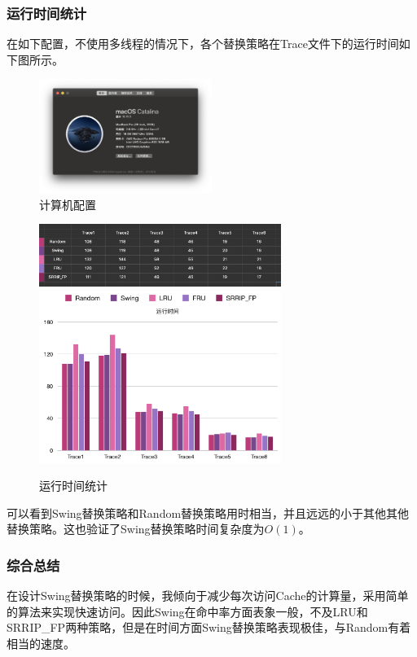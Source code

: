 \documentclass{article}
\begin{document}
\subsubsection{运行时间统计}
在如下配置，不使用多线程的情况下，各个替换策略在Trace文件下的运行时间如下图所示。
\begin{figure}[H]
    \centering
    \includegraphics[width=0.5\textwidth]{pic8.png}
    \caption{计算机配置}
\end{figure}

\begin{figure}[H]
    \centering
    \includegraphics[width=0.7\textwidth]{pic10.png}
    \includegraphics[width=0.7\textwidth]{pic9.png}
    \caption{运行时间统计}
\end{figure}
可以看到Swing替换策略和Random替换策略用时相当，并且远远的小于其他其他替换策略。这也验证了Swing替换策略时间复杂度为$O(1)$。

\subsubsection{综合总结}
在设计Swing替换策略的时候，我倾向于减少每次访问Cache的计算量，采用简单的算法来实现快速访问。因此Swing在命中率方面表象一般，不及LRU和SRRIP\_FP两种策略，但是在时间方面Swing替换策略表现极佳，与Random有着相当的速度。
\end{document}
